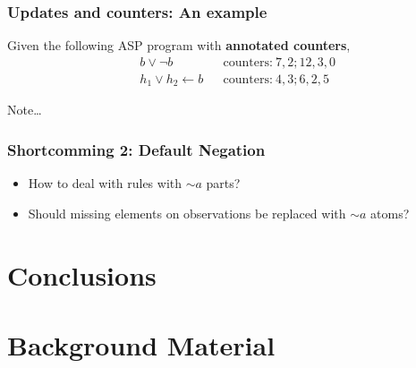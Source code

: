 \documentclass[bigger]{beamer}
\newcommand{\naf}{\ensuremath{\sim\!\!}}
\begin{document}
    \begin{frame}
        \frametitle{Updates and counters: An example}
        Given the following ASP program with \textbf{annotated counters},
        $$        
        \begin{aligned}
            &b \vee \neg b &&\text{counters:}~ 7, 2; 12, 3, 0 \\
            &h_1 \vee h_2 \leftarrow b  &&\text{counters:}~ 4 , 3 ; 6, 2, 5
        \end{aligned}
        $$
        \begin{block}{Note\ldots}
        \end{block}
    \end{frame}
    
    \begin{frame}
        \frametitle{Shortcomming 2: Default Negation}
    
        \begin{itemize}
            \item How to deal with rules with $\naf a$ parts?
            \item Should missing elements on observations be replaced with $\naf a$ atoms?
        \end{itemize}
    \end{frame}
    \section{Conclusions}
    
    \begin{frame}
        \tableofcontents[currentsection]
    \end{frame}
    
    \section*{Background Material}
    
\end{document}
